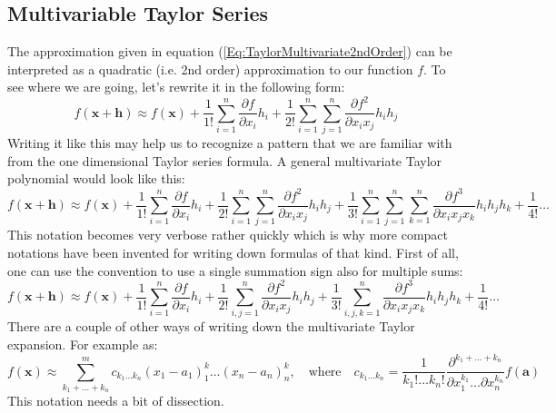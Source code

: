 \subsection{Multivariable Taylor Series} 
The approximation given in equation (\ref{Eq:TaylorMultivariate2ndOrder}) can be interpreted as a quadratic (i.e. 2nd order) approximation to our function $f$. To see where we are going, let's rewrite it in the following form:
\begin{equation}
 f(\mathbf{x + h}) \approx
 f(\mathbf{x}) + 
 \frac{1}{1!} \sum_{i=1}^{n} \frac{\partial f}{\partial x_i} h_i + 
 \frac{1}{2!} \sum_{i=1}^{n} \sum_{j=1}^{n}  \frac{\partial f^2}{\partial x_i x_j} h_i h_j
\end{equation}
Writing it like this may help us to recognize a pattern that we are familiar with from the one dimensional Taylor series formula. A general multivariate Taylor polynomial would look like this:
\begin{equation}
 f(\mathbf{x + h}) \approx
 f(\mathbf{x}) + 
 \frac{1}{1!} \sum_{i=1}^{n} \frac{\partial f}{\partial x_i} h_i + 
 \frac{1}{2!} \sum_{i=1}^{n} \sum_{j=1}^{n}  \frac{\partial f^2}{\partial x_i x_j} h_i h_j +
 \frac{1}{3!} \sum_{i=1}^{n} \sum_{j=1}^{n}  \sum_{k=1}^{n} 
              \frac{\partial f^3}{\partial x_i x_j x_k} h_i h_j h_k + 
 \frac{1}{4!}  \ldots              
\end{equation}
This notation becomes very verbose rather quickly which is why more compact notations have been invented for writing down formulas of that kind. First of all, one can use the convention to use a single summation sign also for multiple sums:
\begin{equation}
 f(\mathbf{x + h}) \approx
 f(\mathbf{x}) + 
 \frac{1}{1!} \sum_{i=1}^{n}     \frac{\partial f}{\partial x_i} h_i + 
 \frac{1}{2!} \sum_{i,j=1}^{n}   \frac{\partial f^2}{\partial x_i x_j} h_i h_j +
 \frac{1}{3!} \sum_{i,j,k=1}^{n} \frac{\partial f^3}{\partial x_i x_j x_k} h_i h_j h_k + 
 \frac{1}{4!}  \ldots              
\end{equation}
There are a couple of other ways of writing down the multivariate Taylor expansion. For example as:
\begin{equation}
 f(\mathbf{x}) \approx
 \sum_{k_1+\ldots+k_n}^{m} c_{k_1 \ldots k_n} (x_1 - a_1)^k_1 \ldots (x_n - a_n)^k_n, 
 \quad \text{where} \quad
 c_{k_1 \ldots k_n} = \frac{1}{k_1 ! \ldots k_n!} 
                      \frac{ \partial^{k_1+\ldots+k_n} }
                           { \partial x_1 ^{k_1} \ldots \partial x_n ^ {k_n}} f(\mathbf{a})
\end{equation}
This notation needs a bit of dissection. 

